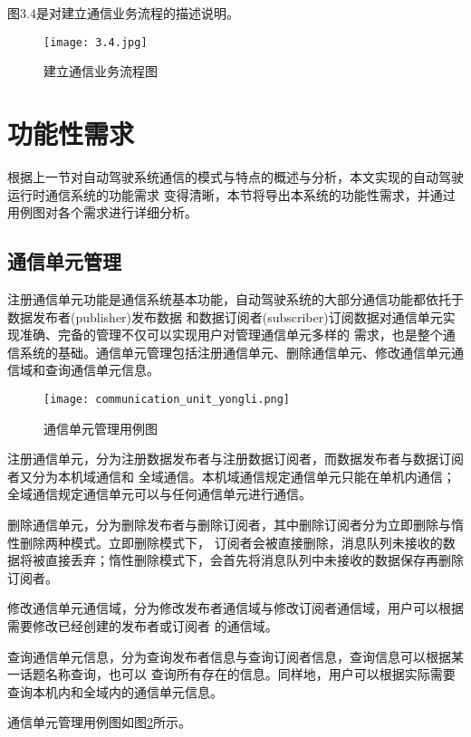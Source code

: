 图3.4是对建立通信业务流程的描述说明。
\begin{figure}[H]
  \centering
  \texttt{[image: 3.4.jpg]}
  \caption{建立通信业务流程图}
  \label{fig:16}
\end{figure}

\section{功能性需求}
根据上一节对自动驾驶系统通信的模式与特点的概述与分析，本文实现的自动驾驶运行时通信系统的功能需求
变得清晰，本节将导出本系统的功能性需求，并通过用例图对各个需求进行详细分析。

\subsection{通信单元管理}
注册通信单元功能是通信系统基本功能，自动驾驶系统的大部分通信功能都依托于数据发布者(publisher)发布数据
和数据订阅者(subscriber)订阅数据对通信单元实现准确、完备的管理不仅可以实现用户对管理通信单元多样的
需求，也是整个通信系统的基础。通信单元管理包括注册通信单元、删除通信单元、修改通信单元通信域和查询通信单元信息。

\begin{figure}[H]
  \centering
  \texttt{[image: communication\_unit\_yongli.png]}
  \caption{通信单元管理用例图}
  \label{communication_unit_yongli}
\end{figure}

注册通信单元，分为注册数据发布者与注册数据订阅者，而数据发布者与数据订阅者又分为本机域通信和
全域通信。本机域通信规定通信单元只能在单机内通信；全域通信规定通信单元可以与任何通信单元进行通信。

删除通信单元，分为删除发布者与删除订阅者，其中删除订阅者分为立即删除与惰性删除两种模式。立即删除模式下，
订阅者会被直接删除，消息队列未接收的数据将被直接丢弃；惰性删除模式下，会首先将消息队列中未接收的数据保存再删除
订阅者。

修改通信单元通信域，分为修改发布者通信域与修改订阅者通信域，用户可以根据需要修改已经创建的发布者或订阅者
的通信域。

查询通信单元信息，分为查询发布者信息与查询订阅者信息，查询信息可以根据某一话题名称查询，也可以
查询所有存在的信息。同样地，用户可以根据实际需要查询本机内和全域内的通信单元信息。

通信单元管理用例图如图\ref{communication_unit_yongli}所示。


